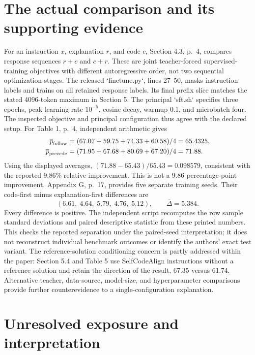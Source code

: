 \documentclass[10pt]{article}
\begin{document}
\section*{The actual comparison and its supporting evidence}
For an instruction \(x\), explanation \(r\), and code \(c\), Section 4.3, p. 4, compares response sequences \(r+c\) and \(c+r\). These are joint teacher-forced supervised-training objectives with different autoregressive order, not two sequential optimization stages. The released `finetune.py`, lines 27–50, masks instruction labels and trains on all retained response labels. Its final prefix slice matches the stated 4096-token maximum in Section 5. The principal `sft.sh` specifies three epochs, peak learning rate \(10^{-5}\), cosine decay, warmup 0.1, and microbatch four. The inspected objective and principal configuration thus agree with the declared setup. For Table 1, p. 4, independent arithmetic gives \[\begin{aligned}
\overline p_{\rm follow}&=(67.07+59.75+74.33+60.58)/4=65.4325,\\
\overline p_{\rm precede}&=(71.95+67.68+80.69+67.20)/4=71.88.\end{aligned}\] Using the displayed averages, \((71.88-65.43)/65.43=0.098579\), consistent with the reported 9.86\% relative improvement. This is not a 9.86 percentage-point improvement. Appendix G, p. 17, provides five separate training seeds. Their code-first minus explanation-first differences are \[(6.61,\;4.64,\;5.79,\;4.76,\;5.12),
\qquad \overline\Delta=5.384.\] Every difference is positive. The independent script recomputes the row sample standard deviations and paired descriptive statistic from these printed numbers. This checks the reported separation under the paired-seed interpretation; it does not reconstruct individual benchmark outcomes or identify the authors’ exact test variant. The reference-solution conditioning concern is partly addressed within the paper: Section 5.4 and Table 5 use SelfCodeAlign instructions without a reference solution and retain the direction of the result, 67.35 versus 61.74. Alternative teacher, data-source, model-size, and hyperparameter comparisons provide further counterevidence to a single-configuration explanation.\par
\section*{Unresolved exposure and interpretation}
\end{document}
